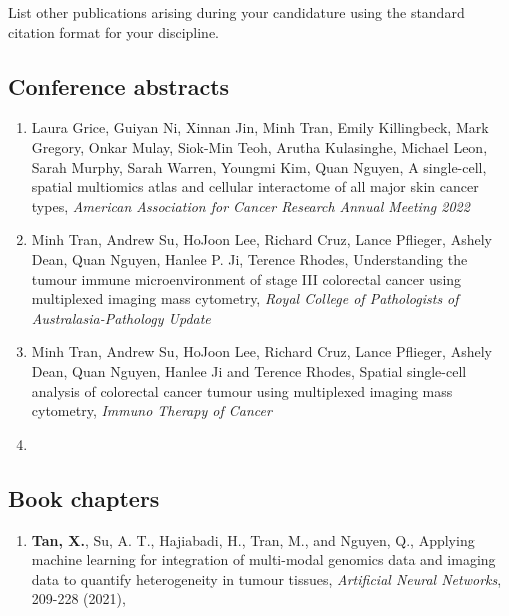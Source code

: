 \begin{instructional}
    List other publications arising during your candidature using the standard citation format for your discipline. 
    
    \subsection*{Conference abstracts}
    \begin{enumerate}

    \item Laura Grice, Guiyan Ni, Xinnan Jin, Minh Tran, Emily Killingbeck, Mark Gregory, Onkar Mulay, Siok-Min Teoh, Arutha Kulasinghe, Michael Leon, Sarah Murphy, Sarah Warren, Youngmi Kim, Quan Nguyen, A single-cell, spatial multiomics atlas and cellular interactome of all major skin cancer types, \textit{American Association for Cancer Research Annual Meeting 2022}
    
    \item Minh Tran, Andrew Su, HoJoon Lee, Richard Cruz, Lance Pflieger, Ashely Dean, Quan Nguyen, Hanlee P. Ji, Terence Rhodes, Understanding the tumour immune microenvironment of stage III colorectal cancer using multiplexed imaging mass cytometry, \textit{Royal College of Pathologists of Australasia-Pathology Update}
    
    \item Minh Tran, Andrew Su, HoJoon Lee, Richard Cruz, Lance Pflieger, Ashely Dean, Quan Nguyen, Hanlee Ji and Terence Rhodes, Spatial single-cell analysis of colorectal cancer tumour using multiplexed imaging mass cytometry, \textit{Immuno Therapy of Cancer}

    \item 
    \end{enumerate}

    \subsection*{Book chapters} 

    \begin{enumerate}

    \item \cite{tan2021applying} \textbf{Tan, X.}, Su, A. T., Hajiabadi, H., Tran, M., and Nguyen, Q., Applying machine learning for integration of multi-modal genomics data and imaging data to quantify heterogeneity in tumour tissues, \textit{Artificial Neural Networks}, 209-228 (2021),


    \end{enumerate}

\end{instructional}

